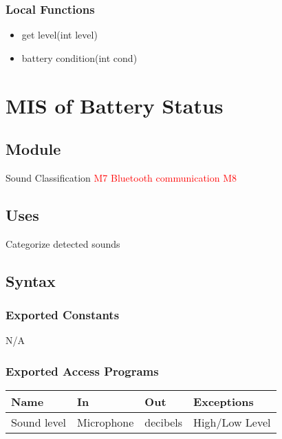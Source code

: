 \documentclass[12pt, titlepage]{article}
\begin{document}
\subsubsection{Local Functions}
\begin{itemize}
\item get level(int level)
\item battery condition(int cond)
\end{itemize}

\section{MIS of Battery Status} \label{Module}

\subsection{Module}

Sound Classification \textcolor{red}{M7}
\newline
\textcolor{red}{Bluetooth communication M8}

\subsection{Uses}

Categorize detected sounds 

\subsection{Syntax}

\subsubsection{Exported Constants}

N/A

\subsubsection{Exported Access Programs}

\begin{center}
\begin{tabular}{p{2cm} p{4cm} p{4cm} p{2cm}}
\hline
\textbf{Name} & \textbf{In} & \textbf{Out} & \textbf{Exceptions} \\
\hline
Sound level & Microphone & decibels & High/Low Level \\
\hline
\end{tabular}
\end{center}
\end{document}
